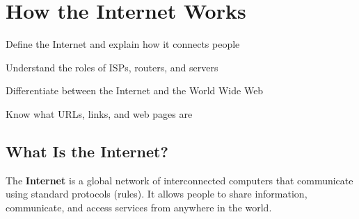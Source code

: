 \chapter{How the Internet Works}
\label{ch:internet}

\begin{objectives}
  \item Define the Internet and explain how it connects people
  \item Understand the roles of ISPs, routers, and servers
  \item Differentiate between the Internet and the World Wide Web
  \item Know what URLs, links, and web pages are
\end{objectives}


\section{What Is the Internet?}
\label{sec:what-internet}

\begin{theorybox}
The \textbf{Internet} is a global network of interconnected computers that communicate using standard protocols (rules). It allows people to share information, communicate, and access services from anywhere in the world.
\end{theorybox}

